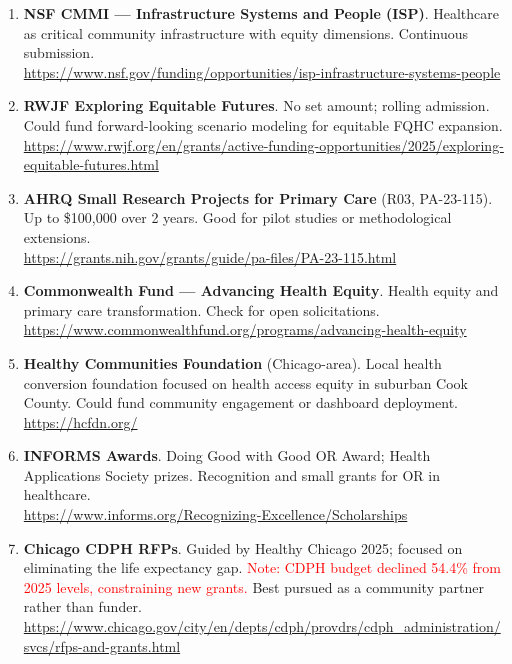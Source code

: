 \documentclass[11pt]{article}
\begin{document}
\begin{enumerate}

\item \textbf{NSF CMMI — Infrastructure Systems and People (ISP)}. Healthcare as critical community infrastructure with equity dimensions. Continuous submission. \\
\url{https://www.nsf.gov/funding/opportunities/isp-infrastructure-systems-people}

\item \textbf{RWJF Exploring Equitable Futures}. No set amount; rolling admission. Could fund forward-looking scenario modeling for equitable FQHC expansion. \\
\url{https://www.rwjf.org/en/grants/active-funding-opportunities/2025/exploring-equitable-futures.html}

\item \textbf{AHRQ Small Research Projects for Primary Care} (R03, PA-23-115). Up to \$100,000 over 2 years. Good for pilot studies or methodological extensions. \\
\url{https://grants.nih.gov/grants/guide/pa-files/PA-23-115.html}

\item \textbf{Commonwealth Fund — Advancing Health Equity}. Health equity and primary care transformation. Check for open solicitations. \\
\url{https://www.commonwealthfund.org/programs/advancing-health-equity}

\item \textbf{Healthy Communities Foundation} (Chicago-area). Local health conversion foundation focused on health access equity in suburban Cook County. Could fund community engagement or dashboard deployment. \\
\url{https://hcfdn.org/}

\item \textbf{INFORMS Awards}. Doing Good with Good OR Award; Health Applications Society prizes. Recognition and small grants for OR in healthcare. \\
\url{https://www.informs.org/Recognizing-Excellence/Scholarships}

\item \textbf{Chicago CDPH RFPs}. Guided by Healthy Chicago 2025; focused on eliminating the life expectancy gap. \textcolor{red}{Note: CDPH budget declined 54.4\% from 2025 levels, constraining new grants.} Best pursued as a community partner rather than funder. \\
\url{https://www.chicago.gov/city/en/depts/cdph/provdrs/cdph_administration/svcs/rfps-and-grants.html}

\end{enumerate}
\end{document}
